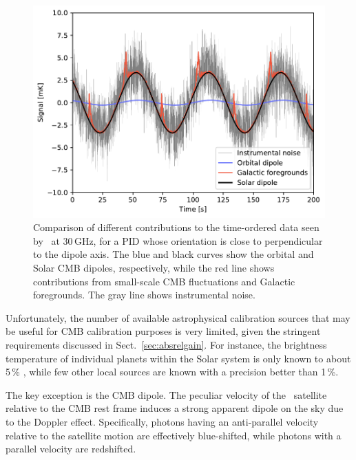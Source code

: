 \documentclass[twocolumn]{aa}
\begin{document}
\begin{figure}[t]
  \center
  \includegraphics[width=\linewidth]{figs/dipole_comparison.pdf}
    \caption{Comparison of different contributions to the time-ordered
      data seen by \Planck\ at 30\,GHz, for a PID whose orientation is close to perpendicular to the dipole axis. The blue and black curves
      show the orbital and Solar CMB
      dipoles, respectively, while the red line shows contributions
      from small-scale CMB fluctuations and Galactic foregrounds. The
      gray line shows instrumental noise. }
  \label{fig:dipole_strengths}
\end{figure}

Unfortunately, the number of available astrophysical calibration
sources that may be useful for CMB calibration purposes is very
limited, given the stringent requirements discussed in
Sect.~\ref{sec:absrelgain}. For instance, the brightness temperature
of individual planets within the Solar system is only known to about
5\,\% \citep{planck2014-a09}, while few other local sources are known
with a precision better than 1\,\%.

The key exception is the CMB dipole. The peculiar velocity of the
\Planck\ satellite relative to the CMB rest frame induces a strong
apparent dipole on the sky due to the Doppler effect. Specifically,
photons having an anti-parallel velocity relative to the satellite
motion are effectively blue-shifted, while photons with a parallel
velocity are redshifted.
\end{document}
